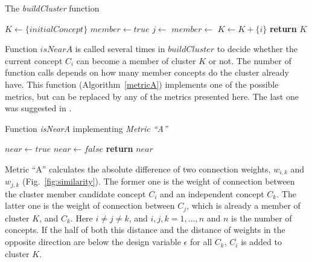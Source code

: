 \documentclass[graybox]{svmult}
\begin{document}
\begin{algorithm}
  \caption{The \emph{buildCluster} function}\label{buildCluster}
  \begin{algorithmic}[1]
    \State $K\gets \{initialConcept\}$
        \State $member \gets true$
          \State $j \gets$ 
          \State $member \gets$ 
        \EndWhile
          \State $K \gets K + \{i\}$
        \EndIf
      \EndIf
    \EndFor
    \State \textbf{return} $K$
    \EndFunction
  \end{algorithmic}
\end{algorithm}

Function $isNearA$ is called several times in $buildCluster$ to decide whether the current concept $C_i$ can become a member of cluster $K$ or not. The number of function calls depends on how many member concepts do the cluster already have. This function (Algorithm~\ref{metricA}) implements one of the possible metrics, but can be replaced by any of the metrics presented here. The last one was suggested in \cite{hatwagnerm.f.koczyl.t.2015}.

\begin{algorithm}
  \caption{Function \emph{isNearA} implementing \emph{Metric ``A''}}\label{metricA}
  \begin{algorithmic}[1]
      \State $near \gets true$
            \State $near \gets false$
          \EndIf
        \EndIf
      \EndFor
      \State \textbf{return} $near$
    \EndFunction
  \end{algorithmic}
\end{algorithm}

Metric ``A'' calculates the absolute difference of two connection weights, $w_{i,k}$ and $w_{j,k}$ (Fig.~\ref{fig:similarity}). The former one is the weight of connection between the cluster member candidate concept $C_i$ and an independent concept $C_k$. The latter one is the weight of connection between $C_j$, which is already a member of cluster $K$, and $C_k$. Here $i \ne j \ne k$, and $i, j, k = 1, ..., n$ and $n$ is the number of concepts. If the half of both this distance and the distance of weights in the opposite direction are below the design variable $\epsilon$ for all $C_k$, $C_i$ is added to cluster $K$.
\end{document}
